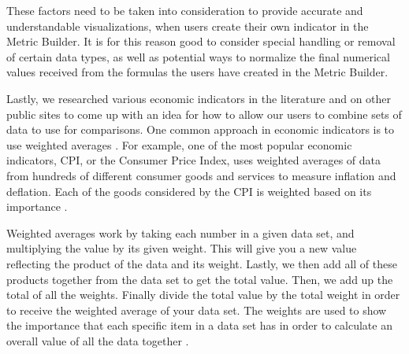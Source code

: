 		These factors need to be taken into consideration to provide accurate and understandable 
		visualizations, when users create their own indicator in the Metric Builder. It is for 
		this reason good to consider special handling or removal of certain data types, as well as potential 
		ways to normalize the final numerical values received from the formulas the users have created in 
		the Metric Builder.

		Lastly, we researched various economic indicators in the literature and on other public sites to come up with an idea for how to allow our users to 
		combine sets of data to use for comparisons. One common approach in economic indicators is to use 
		weighted averages \cite{weightedaverage}. For example, one of the most popular economic indicators, 
		CPI, or the Consumer Price Index, uses weighted averages of data from hundreds of different consumer 
		goods and services to measure inflation and deflation. Each of the goods considered by the CPI is 
		weighted based on its importance \cite{cpi}.

		Weighted averages work by taking each number in a given data set, and multiplying the value by 
		its given weight. This will give you a new value reflecting the product of the data and its weight. 
		Lastly, we then add all of these products together from the data set to get the total value. Then, we add up the total 
		of all the weights. Finally divide the total value by the total weight in order to receive the weighted 
		average of your data set. The weights are used to show the importance that each specific item in a 
		data set has in order to calculate an overall value of all the data together \cite{economic}.
